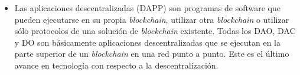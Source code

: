 \begin{itemize}
    \item Las aplicaciones descentralizadas (DAPP) son programas de software que pueden ejecutarse en su propia \textit{blockchain}, utilizar otra \textit{blockchain}  o utilizar sólo protocolos de una solución de \textit{blockchain} existente. Todas los DAO, DAC y DO son básicamente aplicaciones descentralizadas que se ejecutan en la parte superior de un \textit{blockchain} en una red punto a punto. Este es el último avance en tecnología con respecto a la descentralización.

\end{itemize}